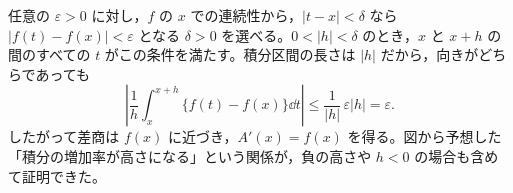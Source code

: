 任意の $\varepsilon>0$ に対し，$f$ の $x$ での連続性から，$|t-x|<\delta$ なら $|f(t)-f(x)|<\varepsilon$ となる $\delta>0$ を選べる。$0<|h|<\delta$ のとき，$x$ と $x+h$ の間のすべての $t$ がこの条件を満たす。積分区間の長さは $|h|$ だから，向きがどちらであっても
\[
 \left|\frac1h\int_x^{x+h}\{f(t)-f(x)\}\dd t\right|
 \le\frac1{|h|}\,\varepsilon|h|=\varepsilon.
\]
したがって差商は $f(x)$ に近づき，$A'(x)=f(x)$ を得る。図から予想した「積分の増加率が高さになる」という関係が，負の高さや $h<0$ の場合も含めて証明できた。

